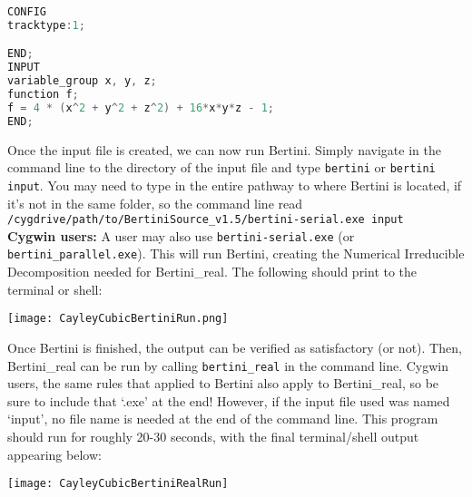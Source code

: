\begin{center}\begin{minipage}{0.9\linewidth}
\begin{lstlisting}[language=c++, caption={\tt input} for the Cayley Cubic, captionpos=b]
CONFIG 
tracktype:1;

END;
INPUT
variable_group x, y, z;
function f;
f = 4 * (x^2 + y^2 + z^2) + 16*x*y*z - 1;
END;
\end{lstlisting}
\end{minipage}\end{center}

Once the input file is created, we can now run Bertini. Simply navigate in the command line to the directory of the input file and type \texttt{bertini} or \texttt{bertini input}.  You may need to type in the entire pathway to where Bertini is located, if it's not in the same folder, so the command line read \newline \texttt{/cygdrive/path/to/BertiniSource\_v1.5/bertini-serial.exe input}\- \\ \textbf{Cygwin users:} A user may also use \texttt{bertini-serial.exe} (or \texttt{bertini\_parallel.exe}). This will run Bertini, creating the Numerical Irreducible Decomposition needed for Bertini\_real. The following should print to the terminal or shell:

\begin{center}\begin{minipage}{0.9\linewidth}
\centering
\texttt{[image: CayleyCubicBertiniRun.png]}
\end{minipage}\end{center}

Once Bertini is finished, the output can be verified as satisfactory (or not). Then, Bertini\_real can be run by calling \texttt{bertini\_real} in the command line. Cygwin users, the same rules that applied to Bertini also apply to Bertini\_real, so be sure to include that `.exe' at the end! However, if the input file used was named `input', no file name is needed at the end of the command line. This program should run for roughly 20-30 seconds, with the final terminal/shell output appearing below:

\begin{center}\begin{minipage}{0.9\linewidth}
\centering
\texttt{[image: CayleyCubicBertiniRealRun]}
\end{minipage}\end{center}


